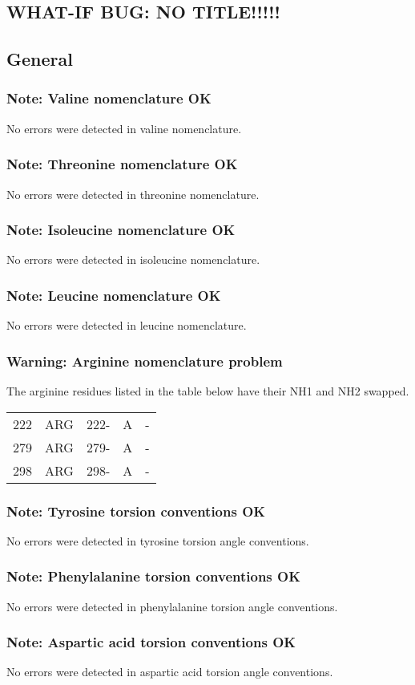 \documentclass[a4paper]{article}
\def\showsect#1{
  \thesect\gdef\thesect{}
  \thessect\gdef\thessect{}
  \subsubsection{#1}
}
\gdef\thesect{\pagebreak[2]\section{WHAT-IF BUG: NO TITLE!!!!!}}
\gdef\thessect{\subsection{General}}
\begin{document}
\begin{note}
\showsect{Note: Valine nomenclature OK}
No errors were detected in valine nomenclature.
\end{note}

\begin{note}
\showsect{Note: Threonine nomenclature OK}
No errors were detected in threonine nomenclature.
\end{note}

\begin{note}
\showsect{Note: Isoleucine nomenclature OK}
No errors were detected in isoleucine nomenclature.
\end{note}

\begin{note}
\showsect{Note: Leucine nomenclature OK}
No errors were detected in leucine nomenclature.
\end{note}

\begin{warning}
\showsect{Warning: Arginine nomenclature problem}
The arginine residues listed in the table below have their NH1 and NH2
swapped.
 
\begin{center}
 
\begin{supertabular}{rr@{ (}r@{) }rl}
  222&ARG & 222-&A &-\\
  279&ARG & 279-&A &-\\
  298&ARG & 298-&A &-\\
\end{supertabular}\end{center}
\end{warning}

\begin{note}
\showsect{Note: Tyrosine torsion conventions OK}
No errors were detected in tyrosine torsion angle conventions.
\end{note}

\begin{note}
\showsect{Note: Phenylalanine torsion conventions OK}
No errors were detected in phenylalanine torsion angle conventions.
\end{note}

\begin{note}
\showsect{Note: Aspartic acid torsion conventions OK}
No errors were detected in aspartic acid torsion angle conventions.
\end{note}
\end{document}
